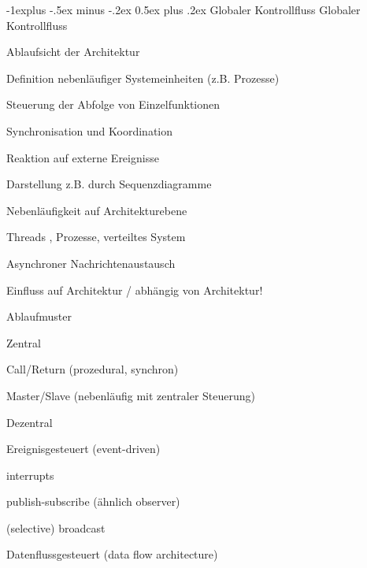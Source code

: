 \documentclass[a4paper]{article}
\makeatletter
\renewcommand{\subsection}{\@startsection{subsection}{2}{0mm}%
                                {-1explus -.5ex minus -.2ex}%
                                {0.5ex plus .2ex}%
                                {\normalfont\normalsize\bfseries}}
\makeatother
\begin{document}
\begin{multicols}{3}
  \subsection{Globaler Kontrollfluss}
  Globaler Kontrollfluss
  \begin{itemize*}
    \item Ablaufsicht der Architektur
    \begin{itemize*}
      \item Definition nebenläufiger Systemeinheiten (z.B. Prozesse)
      \item Steuerung der Abfolge von Einzelfunktionen
      \item Synchronisation und Koordination
      \item Reaktion auf externe Ereignisse
      \item Darstellung z.B. durch Sequenzdiagramme
    \end{itemize*}
    \item Nebenläufigkeit auf Architekturebene
    \begin{itemize*}
      \item Threads , Prozesse, verteiltes System
      \item Asynchroner Nachrichtenaustausch
    \end{itemize*}
    \item Einfluss auf Architektur / abhängig von Architektur!
    \item Ablaufmuster
    \begin{itemize*}
      \item Zentral
      \begin{itemize*}
        \item Call/Return (prozedural, synchron)
        \item Master/Slave (nebenläufig mit zentraler Steuerung)
      \end{itemize*}
      \item Dezentral
      \begin{itemize*}
        \item Ereignisgesteuert (event-driven)
        \item interrupts
        \item publish-subscribe (ähnlich observer)
        \item (selective) broadcast
        \item Datenflussgesteuert (data flow architecture)
      \end{itemize*}
    \end{itemize*}
  \end{itemize*}


\end{multicols}
\end{document}
